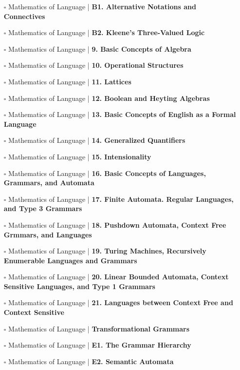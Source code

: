 \documentclass[a4, landscape, 12pt]{article}
\newcommand{\checkbox}{$\square$}%
\begin{document}
\begin{itemize}
{}
\item [\checkbox]  Mathematics of Language | \textbf{ B1. Alternative Notations and Connectives
}
\item [\checkbox]  Mathematics of Language | \textbf{ B2. Kleene's Three-Valued Logic
}
\item [\checkbox]  Mathematics of Language | \textbf{ 9. Basic Concepts of Algebra
}
\item [\checkbox]  Mathematics of Language | \textbf{ 10. Operational Structures
}
\item [\checkbox]  Mathematics of Language | \textbf{ 11. Lattices
}
\item [\checkbox]  Mathematics of Language | \textbf{ 12. Boolean and Heyting Algebras
}
\item [\checkbox]  Mathematics of Language | \textbf{ 13. Basic Concepts of English as a Formal Language
}
\item [\checkbox]  Mathematics of Language | \textbf{ 14. Generalized Quantifiers
}
\item [\checkbox]  Mathematics of Language | \textbf{ 15. Intensionality
}
\item [\checkbox]  Mathematics of Language | \textbf{ 16. Basic Concepts of Languages, Grammars, and Automata
}
\item [\checkbox]  Mathematics of Language | \textbf{ 17. Finite Automata. Regular Languages, and Type 3 Grammars
}
\item [\checkbox]  Mathematics of Language | \textbf{ 18. Pushdown Automata, Context Free Grmmars, and Languages
}
\item [\checkbox]  Mathematics of Language | \textbf{ 19. Turing Machines, Recursively Enumerable Languages and Grammars
}
\item [\checkbox]  Mathematics of Language | \textbf{ 20. Linear Bounded Automata, Context Sensitive Languages, and Type 1 Grammars
}
\item [\checkbox]  Mathematics of Language | \textbf{ 21. Languages between Context Free and Context Sensitive
}
\item [\checkbox]  Mathematics of Language | \textbf{ Transformational Grammars
}
\item [\checkbox]  Mathematics of Language | \textbf{ E1. The Grammar Hierarchy
}
\item [\checkbox]  Mathematics of Language | \textbf{ E2. Semantic Automata
}
\end{itemize}
\end{document}
